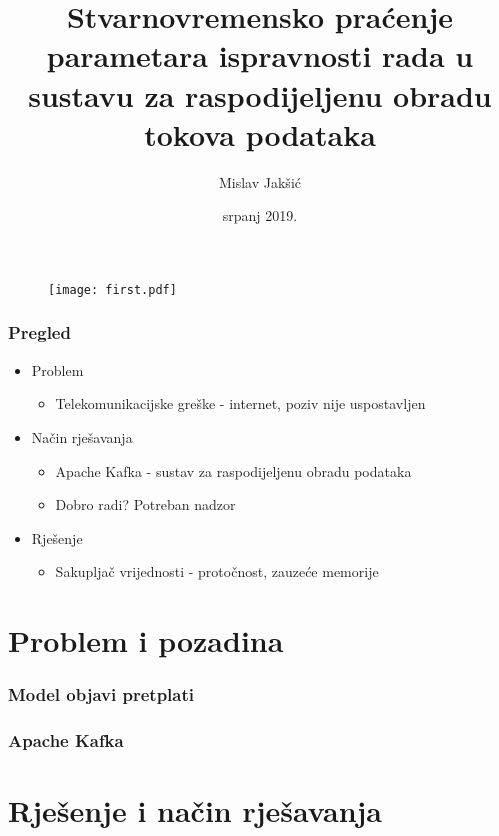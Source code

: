\documentclass{beamer}
\title[Praćenje parametara ispravnosti]{Stvarnovremensko praćenje parametara ispravnosti rada u sustavu za raspodijeljenu obradu tokova podataka}
\author{Mislav Jakšić}
\institute[FER]
{
Sveučilište u Zagrebu \\ 
\medskip
\textit{jaksicmislav@gmail.com} 
}
\date{srpanj 2019.}
\begin{document}
\begin{frame}
\begin{figure}[H]
    \centering
    \texttt{[image: first.pdf]}
\end{figure}
\end{frame}



\begin{frame}
\frametitle{Pregled}

\begin{itemize}
  \item Problem
  \begin{itemize}
    \item Telekomunikacijske greške - internet, poziv nije uspostavljen
  \end{itemize}
  \item Način rješavanja
  \begin{itemize}
    \item Apache Kafka - sustav za raspodijeljenu obradu podataka
    \item Dobro radi? Potreban nadzor
  \end{itemize}
  \item Rješenje
  \begin{itemize}
    \item Sakupljač vrijednosti - protočnost, zauzeće memorije
  \end{itemize}
\end{itemize}
\end{frame}



\section{Problem i pozadina}

\begin{frame}
\frametitle{Model objavi pretplati}

\centering

\end{frame}

\begin{frame}
\frametitle{Apache Kafka}

\centering

\end{frame}



\section{Rješenje i način rješavanja}
\end{document}
